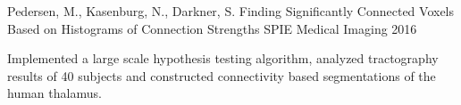 

\begin{cventries}

  \cventry
    {Pedersen, M., Kasenburg, N., Darkner, S.} %
    {Finding Significantly Connected Voxels Based on Histograms of Connection Strengths} %
    {SPIE Medical Imaging} %
    {2016} %
    {
      \begin{cvitems} %
        \item {Implemented a large scale hypothesis testing algorithm, analyzed tractography results of 40 subjects and constructed connectivity based segmentations of the human thalamus.}
      \end{cvitems}
    }

\end{cventries}
